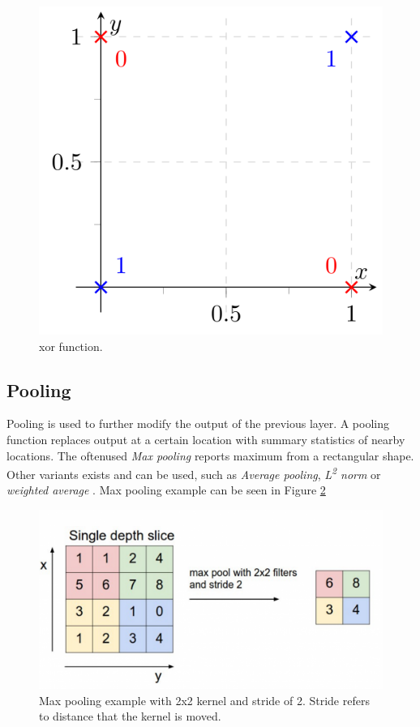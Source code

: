 \documentclass[thesis=B,english]{FITthesis}[2019/12/23]
\begin{document}
    \begin{figure}
        \centering
        \includegraphics[width=.5\textwidth]{xor.png}
        \caption[XOR function]{\gls{xor} function.  \cite{thoma_2016}}
        \label{fig:xor}
    \end{figure}
    
\subsection{Pooling}
    Pooling is used to further modify the output of the previous layer. A pooling function replaces output at a certain location with summary statistics of nearby locations. The oftenused \emph{Max pooling} reports maximum from a rectangular shape. Other variants exists and can be used, such as \emph{Average pooling}, \emph{L\textsuperscript{2} norm} or \emph{weighted average} \cite{bengio2017deep}. Max pooling example can be seen in Figure \ref{fig:maxpooling}
    
    \begin{figure}
        \centering
        \includegraphics[width=.8\textwidth]{max_pooling.png}
        \caption[Max pooling example]{Max pooling example with 2x2 kernel and stride of 2. Stride refers to distance that the kernel is moved.  \cite{max_pooling_image}}
        \label{fig:maxpooling}
    \end{figure}
    
\end{document}
